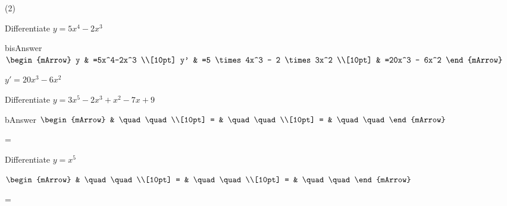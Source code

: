 \clearpage
\begin{mtask}(2)
	\task \begin{exercise} Differentiate $y=5x^4-2x^3$
           \begin{envOut}{bisAnswer}
             $\begin{mArrow}
                    y  & =5x^4-2x^3                         \\[10pt]
		   		    y' & =5 \times 4x^3 - 2 \times 3x^2     \\[10pt]
				       & =20x^3 - 6x^2 
              \end{mArrow}$
            \begin{shortsolution}  
			     $y'=20x^3 - 6x^2$
			\end{shortsolution}				 
           \end{envOut}
         \end{exercise}
	\task \begin{exercise} Differentiate $y=3x^5-2x^3+x^2-7x+9$
           \begin{envOut}{bAnswer}
             $\begin{mArrow}
                   & \quad \quad              \\[10pt]
		   		 = & \quad \quad              \\[10pt]
				 = & \quad \quad 
              \end{mArrow}$
            \begin{shortsolution}  
			     =$ \quad \quad \quad \quad$
			\end{shortsolution}				 
           \end{envOut}
         \end{exercise}
\end{mtask}
\clearpage
\begin{mtask}[resume]
	\task \begin{exercise} Differentiate $y=x^5 $
           \begin{envSolution}
             $\begin{mArrow}
                   & \quad \quad              \\[10pt]
		   		 = & \quad \quad              \\[10pt]
				 = & \quad \quad 
              \end{mArrow}$
            \begin{shortsolution}  
			     =$ \quad \quad \quad \quad$
			\end{shortsolution}				 
           \end{envSolution}
         \end{exercise}
\end{mtask}
